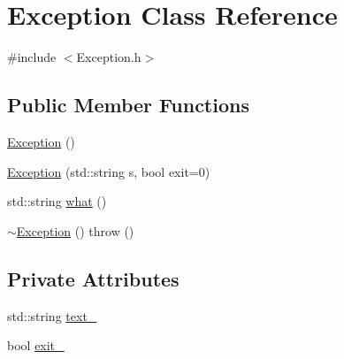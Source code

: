\hypertarget{classException}{\section{\-Exception \-Class \-Reference}
\label{d4/d67/classException}
}


{\ttfamily \#include $<$\-Exception.\-h$>$}

\subsection*{\-Public \-Member \-Functions}
\begin{DoxyCompactItemize}
\item 
\hyperlink{classException_a1b78336bb26edf8e784783cc150c5801}{\-Exception} ()
\item 
\hyperlink{classException_af114f7413b00f29397c8d34e63414204}{\-Exception} (std\-::string s, bool exit=0)
\item 
std\-::string \hyperlink{classException_ae40b22a7b2471b142d861bc33b51a820}{what} ()
\item 
\hyperlink{classException_a6b214cd8627d0968bdeebc1fbb9556b8}{$\sim$\-Exception} ()  throw ()
\end{DoxyCompactItemize}
\subsection*{\-Private \-Attributes}
\begin{DoxyCompactItemize}
\item 
std\-::string \hyperlink{classException_a404e79b557f64d95acfb5dccbb864860}{text\-\_\-}
\item 
bool \hyperlink{classException_a9cf33974b959577efbd947d14e8f4590}{exit\-\_\-}
\end{DoxyCompactItemize}


